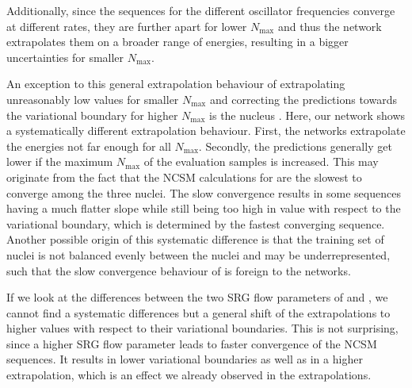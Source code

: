 Additionally, since the sequences for the different oscillator frequencies converge at different rates, they are further apart for lower $N_\mathrm{max}$ and thus the network extrapolates them on a broader range of energies, resulting in a bigger uncertainties for smaller $N_\mathrm{max}$.

An exception to this general extrapolation behaviour of extrapolating unreasonably low values for smaller $N_\mathrm{max}$ and correcting the predictions towards the variational boundary for higher $N_\mathrm{max}$ is the nucleus . Here, our network shows a systematically different extrapolation behaviour. First, the networks extrapolate the energies not far enough for all $N_\mathrm{max}$. Secondly, the predictions generally get lower if the maximum $N_\mathrm{max}$ of the evaluation samples is increased. This may originate from the fact that the NCSM calculations for  are the slowest to converge among the three nuclei. The slow convergence results in some sequences having a much flatter slope while still being too high in value with respect to the variational boundary, which is determined by the fastest converging sequence. Another possible origin of this systematic difference is that the training set of nuclei is not balanced evenly between the nuclei and  may be underrepresented, such that the slow convergence behaviour of  is foreign to the networks.

If we look at the differences between the two SRG flow parameters of  and , we cannot find a systematic differences but a general shift of the extrapolations to higher values with respect to their variational boundaries. This is not surprising, since a higher SRG flow parameter leads to faster convergence of the NCSM sequences. It results in lower variational boundaries as well as in a higher extrapolation, which is an effect we already observed in the  extrapolations.
